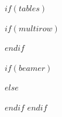 
$if(tables)$
  \usepackage{longtable,booktabs,array}
  $if(multirow)$
    \usepackage{multirow}
  $endif$
  \usepackage{calc} %
  $if(beamer)$
    \usepackage{caption}
    \makeatletter
    \def\fnum@table{\tablename~\thetable}
    \makeatother
  $else$
    \usepackage{etoolbox}
    \makeatletter
    \patchcmd\longtable{\par}{\if@noskipsec\mbox{}\fi\par}{}{}
    \makeatother
  $endif$
$endif$
